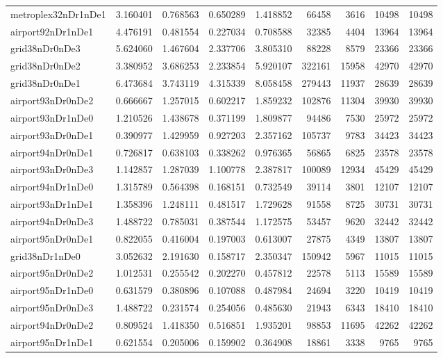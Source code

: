 \begin{longtable}{|l|r|r|r|r|r|r|r|r|}
metroplex32nDr1nDe1 & 3.160401 & 0.768563 & 0.650289 & 1.418852 & 66458 & 3616 & 10498 & 10498 \\
airport92nDr1nDe1 & 4.476191 & 0.481554 & 0.227034 & 0.708588 & 32385 & 4404 & 13964 & 13964 \\
grid38nDr0nDe3 & 5.624060 & 1.467604 & 2.337706 & 3.805310 & 88228 & 8579 & 23366 & 23366 \\
grid38nDr0nDe2 & 3.380952 & 3.686253 & 2.233854 & 5.920107 & 322161 & 15958 & 42970 & 42970 \\
grid38nDr0nDe1 & 6.473684 & 3.743119 & 4.315339 & 8.058458 & 279443 & 11937 & 28639 & 28639 \\
airport93nDr0nDe2 & 0.666667 & 1.257015 & 0.602217 & 1.859232 & 102876 & 11304 & 39930 & 39930 \\
airport93nDr1nDe0 & 1.210526 & 1.438678 & 0.371199 & 1.809877 & 94486 & 7530 & 25972 & 25972 \\
airport93nDr0nDe1 & 0.390977 & 1.429959 & 0.927203 & 2.357162 & 105737 & 9783 & 34423 & 34423 \\
airport94nDr0nDe1 & 0.726817 & 0.638103 & 0.338262 & 0.976365 & 56865 & 6825 & 23578 & 23578 \\
airport93nDr0nDe3 & 1.142857 & 1.287039 & 1.100778 & 2.387817 & 100089 & 12934 & 45429 & 45429 \\
airport94nDr1nDe0 & 1.315789 & 0.564398 & 0.168151 & 0.732549 & 39114 & 3801 & 12107 & 12107 \\
airport93nDr1nDe1 & 1.358396 & 1.248111 & 0.481517 & 1.729628 & 91558 & 8725 & 30731 & 30731 \\
airport94nDr0nDe3 & 1.488722 & 0.785031 & 0.387544 & 1.172575 & 53457 & 9620 & 32442 & 32442 \\
airport95nDr0nDe1 & 0.822055 & 0.416004 & 0.197003 & 0.613007 & 27875 & 4349 & 13807 & 13807 \\
grid38nDr1nDe0 & 3.052632 & 2.191630 & 0.158717 & 2.350347 & 150942 & 5967 & 11015 & 11015 \\
airport95nDr0nDe2 & 1.012531 & 0.255542 & 0.202270 & 0.457812 & 22578 & 5113 & 15589 & 15589 \\
airport95nDr1nDe0 & 0.631579 & 0.380896 & 0.107088 & 0.487984 & 24694 & 3220 & 10419 & 10419 \\
airport95nDr0nDe3 & 1.488722 & 0.231574 & 0.254056 & 0.485630 & 21943 & 6343 & 18410 & 18410 \\
airport94nDr0nDe2 & 0.809524 & 1.418350 & 0.516851 & 1.935201 & 98853 & 11695 & 42262 & 42262 \\
airport95nDr1nDe1 & 0.621554 & 0.205006 & 0.159902 & 0.364908 & 18861 & 3338 & 9765 & 9765 \\

\end{longtable}
